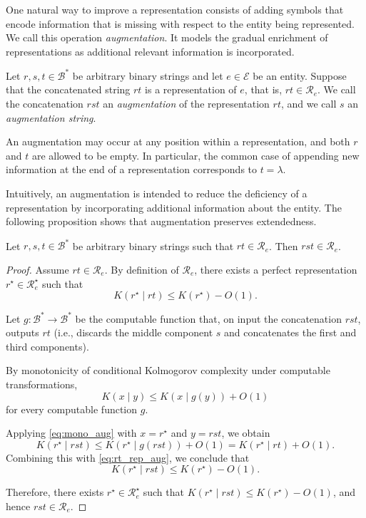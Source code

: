 One natural way to improve a representation consists of adding symbols that encode information that is missing with respect to the entity being represented. We call this operation \emph{augmentation}. It models the gradual enrichment of representations as additional relevant information is incorporated.

\begin{definition}
Let $r, s, t \in \mathcal{B}^*$ be arbitrary binary strings and let $e \in \mathcal{E}$ be an entity. Suppose that the concatenated string $rt$ is a representation of $e$, that is, $rt \in \mathcal{R}_{e}$. We call the concatenation $rst$ an \emph{augmentation} of the representation $rt$, and we call $s$ an \emph{augmentation string}.
\end{definition}

An augmentation may occur at any position within a representation, and both $r$ and $t$ are allowed to be empty. In particular, the common case of appending new information at the end of a representation corresponds to $t=\lambda$.

Intuitively, an augmentation is intended to reduce the deficiency of a representation by incorporating additional information about the entity. The following proposition shows that augmentation preserves extendedness.

\begin{proposition}
Let $r, s, t \in \mathcal{B}^*$ be arbitrary binary strings such that $rt \in \mathcal{R}_{e}$. Then $rst \in \mathcal{R}_{e}$.
\end{proposition}

\begin{proof}
Assume $rt \in \mathcal{R}_{e}$. By definition of $\mathcal{R}_{e}$, there exists a perfect representation
$r^{\star}\in\mathcal{R}_{e}^{\star}$ such that
\begin{equation}
\label{eq:rt_rep_aug}
K(r^{\star}\mid rt)\le K(r^{\star})-O(1).
\end{equation}

Let $g:\mathcal{B}^*\to \mathcal{B}^*$ be the computable function that, on input the concatenation
$rst$, outputs $rt$ (i.e., discards the middle component $s$ and concatenates the first and third components).

By monotonicity of conditional Kolmogorov complexity under computable transformations,
\begin{equation}
\label{eq:mono_aug}
K(x\mid y)\le K(x\mid g(y)) + O(1)
\end{equation}
for every computable function $g$.

Applying \eqref{eq:mono_aug} with $x=r^{\star}$ and $y=rst$, we obtain
\[
K(r^{\star}\mid rst)
\le
K(r^{\star}\mid g(rst)) + O(1)
=
K(r^{\star}\mid rt) + O(1).
\]
Combining this with \eqref{eq:rt_rep_aug}, we conclude that
\[
K(r^{\star}\mid rst)
\le
K(r^{\star}) - O(1).
\]

Therefore, there exists $r^{\star}\in\mathcal{R}_{e}^{\star}$ such that
$K(r^{\star}\mid rst)\le K(r^{\star})-O(1)$, and hence $rst\in\mathcal{R}_{e}$.
\end{proof}


